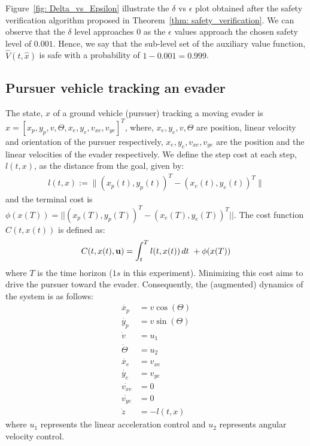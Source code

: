 Figure~\ref{fig: Delta_vs_Epsilon} illustrate the $\delta$ vs $\epsilon$ plot obtained after the safety verification algorithm proposed in Theorem~\ref{thm: safety_verification}. We can observe that the $\delta$ level approaches $0$ as the $\epsilon$ values approach the chosen safety level of $0.001$. Hence, we say that the sub-level set of the auxiliary value function, $\hat{V}(t, \hat{x})$ is safe with a probability of $1-0.001=0.999$.  

\subsection{Pursuer vehicle tracking an evader}\label{appendix: Track}
The state, $x$ of a ground vehicle (pursuer) tracking a moving evader is $x = [x_p, y_p, v, \Theta, x_{e}, y_{e}, v_{xe}, v_{ye}]^T$, where, $x_e, y_e, v, \Theta$ are position, linear velocity and orientation of the pursuer respectively, $x_{e}, y_{e}, v_{xe}, v_{ye}$ are the position and the linear velocities of the evader respectively. We define the step cost at each step, $l(t,x)$, as the distance from the goal, given by:
\begin{align*}
    l(t,x) :=  \| (x_p(t), y_p(t))^T - (x_{e}(t), y_{e}(t))^T\|
\end{align*}
and the terminal cost is $\phi(x(T)) = || (x_p(T), y_p(T))^T - (x_e(T), y_e(T))^T||$.
The cost function $C(t, x(t))$ is defined as:
\begin{equation}
 \begin{aligned}
     C(t,x(t), \mathbf{u}) = \int_t^{T} l(t, x(t)) \, dt ~ +
     \phi(x(T))
   \end{aligned}
\end{equation}
where $T$ is the time horizon ($1s$ in this experiment). Minimizing this cost aims to drive the pursuer toward the evader. 
Consequently, the (augmented) dynamics of the system is as follows:
\begin{align*}
    \dot{x_p} &= v \cos(\Theta) \\
    \dot{y_p} &= v \sin(\Theta) \\
    \dot{v} &= u_1 \\
    \dot{\Theta} &= u_2 \\
    \dot{x_{e}} &= v_{xe} \\
    \dot{y_{e}} &= v_{ye} \\
    \dot{v_{xe}} &= 0 \\
    \dot{v_{ye}} &= 0 \\
    \dot{z} &= - l(t,x)
\end{align*}
where $u_1$ represents the linear acceleration control and $u_2$ represents angular velocity control.

